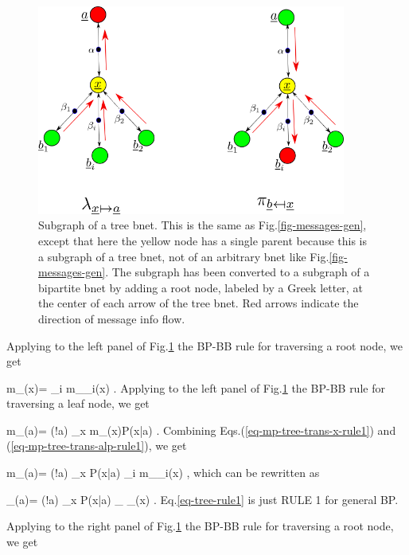 \begin{figure}[h!]
\centering
\includegraphics[width=4in]
{mpass/mpass-messages-bip-tree.png}
\caption{Subgraph of a tree bnet. 
This 
is the same as 
Fig.\ref{fig-messages-gen},
except that here the yellow
node has a single
parent because 
this is a subgraph of a tree
bnet, not
of an arbitrary
bnet like Fig.\ref{fig-messages-gen}.
The subgraph has been
converted to a subgraph
of a bipartite bnet
by  adding a root node, labeled
by a Greek letter, 
at the center
of each arrow of the tree bnet.
Red arrows indicate
the direction
of message info flow.}
\label{fig-messages-bip-tree}
\end{figure}

Applying to the left panel of
Fig.\ref{fig-messages-bip-tree}
 the BP-BB rule
for traversing a root node, we get

\beq
m_{\alp\ldart \rvx}(x)=
\prod_{i}
m_{\beta_i\rdart \rvx}(x)
\;.
\label{eq-mp-tree-trans-x-rule1}
\eeq
Applying to the left panel of
Fig.\ref{fig-messages-bip-tree}
 the BP-BB rule
for traversing a leaf node, we get

\beq
m_{\alp\rdart\rva}(a)=
\caln(!a)
\sum_x
m_{\alp\ldart \rvx}(x)P(x|a)
\;.
\label{eq-mp-tree-trans-alp-rule1}
\eeq
Combining Eqs.(\ref{eq-mp-tree-trans-x-rule1})
and (\ref{eq-mp-tree-trans-alp-rule1}), we get

\beq
m_{\alp\rdart\rva}(a)=
\caln(!a)
\sum_x P(x|a)
\prod_{i}
m_{\beta_i\rdart \rvx}(x)
\;,
\eeq
which can be
rewritten as 

\beq
\lam_{\rvx\rdart\rva}(a)=
\caln(!a)
\sum_x P(x|a)
_
{\lam_\rvx(x)}
\;.
\label{eq-tree-rule1}
\eeq
Eq.\ref{eq-tree-rule1} is just RULE 1
for general BP.

Applying to the right panel of
Fig.\ref{fig-messages-bip-tree}
 the BP-BB rule
for traversing a root node, we get

